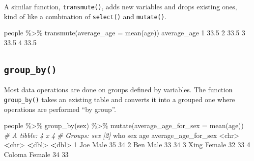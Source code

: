 \documentclass[
]{book}
\newenvironment{Shaded}{\begin{snugshade}}{\end{snugshade}}
\newcommand{\AttributeTok}[1]{\textcolor[rgb]{0.77,0.63,0.00}{#1}}
\newcommand{\CommentTok}[1]{\textcolor[rgb]{0.56,0.35,0.01}{\textit{#1}}}
\newcommand{\DecValTok}[1]{\textcolor[rgb]{0.00,0.00,0.81}{#1}}
\newcommand{\ErrorTok}[1]{\textcolor[rgb]{0.64,0.00,0.00}{\textbf{#1}}}
\newcommand{\FloatTok}[1]{\textcolor[rgb]{0.00,0.00,0.81}{#1}}
\newcommand{\FunctionTok}[1]{\textcolor[rgb]{0.00,0.00,0.00}{#1}}
\newcommand{\NormalTok}[1]{#1}
\newcommand{\SpecialCharTok}[1]{\textcolor[rgb]{0.00,0.00,0.00}{#1}}
\begin{document}
A similar function, \texttt{transmute()}, adds new variables and drops existing ones, kind of like a combination of \texttt{select()} and \texttt{mutate()}.

\begin{Shaded}
\begin{Highlighting}[]
\NormalTok{people }\SpecialCharTok{\%\textgreater{}\%} \FunctionTok{transmute}\NormalTok{(}\AttributeTok{average\_age =} \FunctionTok{mean}\NormalTok{(age))}
\NormalTok{  average\_age}
\DecValTok{1}        \FloatTok{33.5}
\DecValTok{2}        \FloatTok{33.5}
\DecValTok{3}        \FloatTok{33.5}
\DecValTok{4}        \FloatTok{33.5}
\end{Highlighting}
\end{Shaded}

\hypertarget{group_by}{%
\subsection*{\texorpdfstring{\texttt{group\_by()}}{group\_by()}}\label{group_by}}

Most data operations are done on groups defined by variables. The function \texttt{group\_by()} takes an existing table and converts it into a grouped one where operations are performed ``by group''.

\begin{Shaded}
\begin{Highlighting}[]
\NormalTok{people }\SpecialCharTok{\%\textgreater{}\%} 
  \FunctionTok{group\_by}\NormalTok{(sex) }\SpecialCharTok{\%\textgreater{}\%}
  \FunctionTok{mutate}\NormalTok{(}\AttributeTok{average\_age\_for\_sex =} \FunctionTok{mean}\NormalTok{(age)) }
\CommentTok{\# A tibble: 4 x 4}
\CommentTok{\# Groups:   sex [2]}
\NormalTok{  who    sex      age average\_age\_for\_sex}
  \SpecialCharTok{\textless{}}\NormalTok{chr}\SpecialCharTok{\textgreater{}}  \ErrorTok{\textless{}}\NormalTok{chr}\SpecialCharTok{\textgreater{}}  \ErrorTok{\textless{}}\NormalTok{dbl}\SpecialCharTok{\textgreater{}}               \ErrorTok{\textless{}}\NormalTok{dbl}\SpecialCharTok{\textgreater{}}
\DecValTok{1}\NormalTok{ Joe    Male      }\DecValTok{35}                  \DecValTok{34}
\DecValTok{2}\NormalTok{ Ben    Male      }\DecValTok{33}                  \DecValTok{34}
\DecValTok{3}\NormalTok{ Xing   Female    }\DecValTok{32}                  \DecValTok{33}
\DecValTok{4}\NormalTok{ Coloma Female    }\DecValTok{34}                  \DecValTok{33}
\end{Highlighting}
\end{Shaded}
\end{document}
